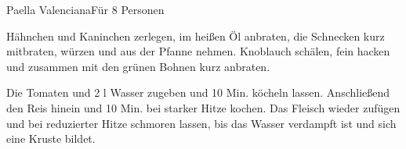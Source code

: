 \begin{recipe}{Paella Valenciana}{Für 8 Personen}
  \label{Paella}
  \inglist
  
  \steps Hähnchen und Kaninchen zerlegen, im heißen Öl anbraten, die Schnecken kurz
  mitbraten, würzen und aus der Pfanne nehmen. Knoblauch schälen, fein hacken und zusammen
  mit den grünen Bohnen kurz anbraten. 
  
  Die Tomaten und 2 \halb l Wasser zugeben und 10 Min. köcheln lassen. Anschließend den
  Reis hinein und 10 Min. bei starker Hitze kochen. Das Fleisch wieder zufügen und bei
  reduzierter Hitze schmoren lassen, bis das Wasser verdampft ist und sich eine Kruste
  bildet. 
  
\end{recipe}


